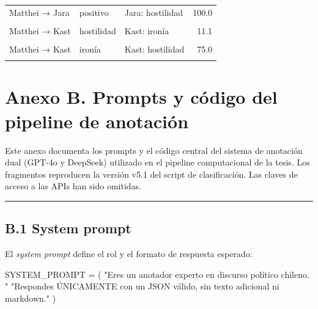 \documentclass[
  letterpaper,
  numbers=noendperiod,
  fontsize=11pt,
  DIV=12,
  titlepage=false]{scrreprt}
\newenvironment{Shaded}{\begin{snugshade}}{\end{snugshade}}
\newcommand{\NormalTok}[1]{\textcolor[rgb]{0.00,0.23,0.31}{#1}}
\newcommand{\OperatorTok}[1]{\textcolor[rgb]{0.37,0.37,0.37}{#1}}
\newcommand{\StringTok}[1]{\textcolor[rgb]{0.13,0.47,0.30}{#1}}
\begin{document}
\begin{table}
{{\begin{tabular}{lllr}
\addlinespace
Matthei → Jara & positivo & Jara: hostilidad & 100.0\\
\cellcolor{gray!10}{Matthei → Kast} & \cellcolor{gray!10}{hostilidad} & \cellcolor{gray!10}{Kast: hostilidad} & \cellcolor{gray!10}{77.8}\\
Matthei → Kast & hostilidad & Kast: ironía & 11.1\\
\cellcolor{gray!10}{Matthei → Kast} & \cellcolor{gray!10}{hostilidad} & \cellcolor{gray!10}{Kast: positivo} & \cellcolor{gray!10}{11.1}\\
Matthei → Kast & ironía & Kast: hostilidad & 75.0\\
\addlinespace
\cellcolor{gray!10}{Matthei → Kast} & \cellcolor{gray!10}{ironía} & \cellcolor{gray!10}{Kast: ironía} & \cellcolor{gray!10}{25.0}\\
\bottomrule
\end{tabular}}

}

\end{table}%

\clearpage


\chapter{Anexo B. Prompts y código del pipeline de
anotación}\label{anexo-b.-prompts-y-cuxf3digo-del-pipeline-de-anotaciuxf3n}

Este anexo documenta los prompts y el código central del sistema de
anotación dual (GPT-4o y DeepSeek) utilizado en el pipeline
computacional de la tesis. Los fragmentos reproducen la versión v5.1 del
script de clasificación. Las claves de acceso a las APIs han sido
omitidas.

\begin{center}\rule{0.5\linewidth}{0.5pt}\end{center}

\section{B.1 System prompt}\label{b.1-system-prompt}

El \emph{system prompt} define el rol y el formato de respuesta
esperado:

\begin{Shaded}
\begin{Highlighting}[]
\NormalTok{SYSTEM\_PROMPT }\OperatorTok{=}\NormalTok{ (}
    \StringTok{"Eres un anotador experto en discurso político chileno. "}
    \StringTok{"Respondes ÚNICAMENTE con un JSON válido, sin texto adicional ni markdown."}
\NormalTok{)}
\end{Highlighting}
\end{Shaded}
\end{document}
